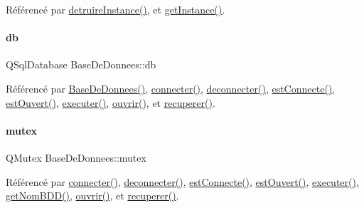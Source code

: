 Référencé par \hyperlink{class_base_de_donnees_a457401c0816b888c77ce915997545f4e}{detruire\+Instance()}, et \hyperlink{class_base_de_donnees_a80028aa2b6b4fbf30fb2e36357b7d3d3}{get\+Instance()}.

\mbox{\label{class_base_de_donnees_a3e738dcf443370c46a541677ab619f06}} 
\paragraph{\texorpdfstring{db}{db}}
{\footnotesize\ttfamily Q\+Sql\+Database Base\+De\+Donnees\+::db\hspace{0.3cm}{\ttfamily [private]}}



Référencé par \hyperlink{class_base_de_donnees_a10dd177f1008f675ab78c2221b2a6750}{Base\+De\+Donnees()}, \hyperlink{class_base_de_donnees_ac20da193923a9bfea5e38ee5a54820cd}{connecter()}, \hyperlink{class_base_de_donnees_ae780999d25a26a0e4dbe0706a4785978}{deconnecter()}, \hyperlink{class_base_de_donnees_a00388973f3ec42e5c8e76e7af7e124b2}{est\+Connecte()}, \hyperlink{class_base_de_donnees_af9ac332082ffd0dd35e412cefabe5e9c}{est\+Ouvert()}, \hyperlink{class_base_de_donnees_aa8de5f8f8bb17edc43f5c0ee33712081}{executer()}, \hyperlink{class_base_de_donnees_a7f6a5510b08017b0d99115a84252f186}{ouvrir()}, et \hyperlink{class_base_de_donnees_a77539baad389f5acf754cd2cd452403e}{recuperer()}.

\mbox{\label{class_base_de_donnees_aa1b4696fac87a740f914aa73739086f2}} 
\paragraph{\texorpdfstring{mutex}{mutex}}
{\footnotesize\ttfamily Q\+Mutex Base\+De\+Donnees\+::mutex\hspace{0.3cm}{\ttfamily [private]}}



Référencé par \hyperlink{class_base_de_donnees_ac20da193923a9bfea5e38ee5a54820cd}{connecter()}, \hyperlink{class_base_de_donnees_ae780999d25a26a0e4dbe0706a4785978}{deconnecter()}, \hyperlink{class_base_de_donnees_a00388973f3ec42e5c8e76e7af7e124b2}{est\+Connecte()}, \hyperlink{class_base_de_donnees_af9ac332082ffd0dd35e412cefabe5e9c}{est\+Ouvert()}, \hyperlink{class_base_de_donnees_aa8de5f8f8bb17edc43f5c0ee33712081}{executer()}, \hyperlink{class_base_de_donnees_a467909531ae3cdebaf173f6e97cdc624}{get\+Nom\+B\+D\+D()}, \hyperlink{class_base_de_donnees_a7f6a5510b08017b0d99115a84252f186}{ouvrir()}, et \hyperlink{class_base_de_donnees_a77539baad389f5acf754cd2cd452403e}{recuperer()}.

